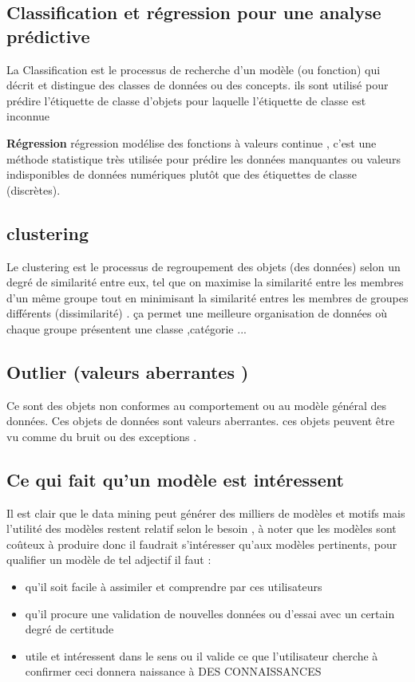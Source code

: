 \documentclass[12pt,a4paper,oneside]{book}
\begin{document}
\subsection{Classification et régression pour une analyse prédictive}
La Classification
est le processus de recherche d'un
modèle
(ou fonction) qui décrit et distingue
des classes de données ou des concepts.
ils sont utilisé
pour prédire l'étiquette de classe d'objets pour laquelle l'étiquette de classe est inconnue 

\textbf{  Régression}
régression modélise des fonctions à valeurs continue , c'est une méthode statistique  très utilisée pour prédire les données manquantes ou valeurs indisponibles de données numériques
plutôt que des étiquettes de classe (discrètes).
\subsection{clustering}
Le clustering est le processus de regroupement des objets (des données) selon un degré de similarité entre eux, tel que  on maximise la similarité entre les membres d'un même groupe  tout en minimisant la similarité  entres les membres  de groupes différents (dissimilarité) . ça permet une meilleure organisation de données où chaque groupe présentent une classe ,catégorie ...
\subsection{Outlier (valeurs aberrantes )}
Ce sont des objets non conformes au comportement ou au modèle général des données. Ces objets de données sont valeurs aberrantes. ces objets peuvent être vu comme du bruit ou des exceptions .
\subsection{Ce qui fait qu'un modèle est intéressent}
Il est clair que le data mining peut générer des milliers de modèles et motifs mais l'utilité des modèles restent relatif selon le besoin , à noter que les modèles sont coûteux à produire donc il faudrait s'intéresser qu'aux modèles pertinents, pour qualifier un modèle de tel adjectif il faut :
\begin{itemize}
	\item qu'il soit facile à assimiler et comprendre par ces utilisateurs
	\item qu'il procure une validation de nouvelles données ou d'essai avec un certain degré de certitude
	\item utile et intéressent dans le sens ou il valide ce que l'utilisateur cherche à confirmer ceci donnera naissance à DES CONNAISSANCES
\end{itemize}
\end{document}
